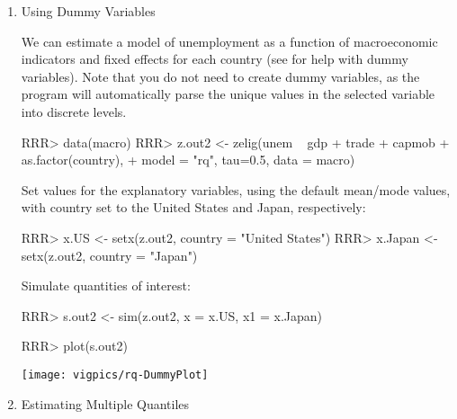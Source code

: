 \begin{enumerate}
\item Using Dummy Variables

We can estimate a model of unemployment as a function of macroeconomic indicators
and fixed effects for each country (see  for help with dummy variables). 
Note that you do not need to create dummy variables, as the program will automatically
parse the unique values in the selected variable into discrete levels.  
\begin{Schunk}
\begin{Sinput}
RRR>  data(macro)
RRR>  z.out2 <- zelig(unem ~ gdp + trade + capmob + as.factor(country), 
+                   model = "rq", tau=0.5, data = macro)
\end{Sinput}
\end{Schunk}
Set values for the explanatory variables, using the default mean/mode
values, with country set to the United States and Japan, respectively:
\begin{Schunk}
\begin{Sinput}
RRR>  x.US <- setx(z.out2, country = "United States")
RRR>  x.Japan <- setx(z.out2, country = "Japan")
\end{Sinput}
\end{Schunk}
Simulate quantities of interest:
\begin{Schunk}
\begin{Sinput}
RRR>  s.out2 <- sim(z.out2, x = x.US, x1 = x.Japan)
\end{Sinput}
\end{Schunk}
\begin{center}
\begin{Schunk}
\begin{Sinput}
RRR>  plot(s.out2)
\end{Sinput}
\end{Schunk}
\texttt{[image: vigpics/rq-DummyPlot]}
\end{center}

\item Estimating Multiple Quantiles


\end{enumerate}
